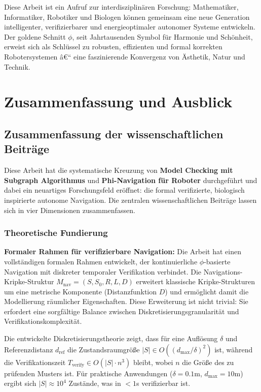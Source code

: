 ﻿\documentclass[a4paper,12pt]{article}
\theoremstyle{definition}
\begin{document}
Diese Arbeit ist ein Aufruf zur interdisziplinären Forschung: Mathematiker, Informatiker, Robotiker und Biologen können gemeinsam eine neue Generation intelligenter, verifizierbarer und energieoptimaler autonomer Systeme entwickeln. Der goldene Schnitt $\phi$, seit Jahrtausenden Symbol für Harmonie und Schönheit, erweist sich als Schlüssel zu robusten, effizienten und formal korrekten Robotersystemen â€“ eine faszinierende Konvergenz von Ästhetik, Natur und Technik.

\section{Zusammenfassung und Ausblick}

\subsection{Zusammenfassung der wissenschaftlichen Beiträge}

Diese Arbeit hat die systematische Kreuzung von \textbf{Model Checking mit Subgraph Algorithmus} und \textbf{Phi-Navigation für Roboter} durchgeführt und dabei ein neuartiges Forschungsfeld eröffnet: die formal verifizierte, biologisch inspirierte autonome Navigation. Die zentralen wissenschaftlichen Beiträge lassen sich in vier Dimensionen zusammenfassen.

\subsubsection{Theoretische Fundierung}

\textbf{Formaler Rahmen für verifizierbare Navigation:}
Die Arbeit hat einen vollständigen formalen Rahmen entwickelt, der kontinuierliche $\phi$-basierte Navigation mit diskreter temporaler Verifikation verbindet. Die Navigations-Kripke-Struktur $M_{\text{nav}} = (S, S_0, R, L, D)$ erweitert klassische Kripke-Strukturen um eine metrische Komponente (Distanzfunktion $D$) und ermöglicht damit die Modellierung räumlicher Eigenschaften. Diese Erweiterung ist nicht trivial: Sie erfordert eine sorgfältige Balance zwischen Diskretisierungsgranularität und Verifikationskomplexität.

Die entwickelte Diskretisierungstheorie zeigt, dass für eine Auflösung $\delta$ und Referenzdistanz $d_{\text{ref}}$ die Zustandsraumgröße $|S| \in O((d_{\text{max}}/\delta)^2)$ ist, während die Verifikationszeit $T_{\text{verify}} \in O(|S| \cdot n^3)$ bleibt, wobei $n$ die Größe des zu prüfenden Musters ist. Für praktische Anwendungen ($\delta = 0.1\text{m}$, $d_{\text{max}} = 10\text{m}$) ergibt sich $|S| \approx 10^4$ Zustände, was in $< 1$s verifizierbar ist.
\end{document}
